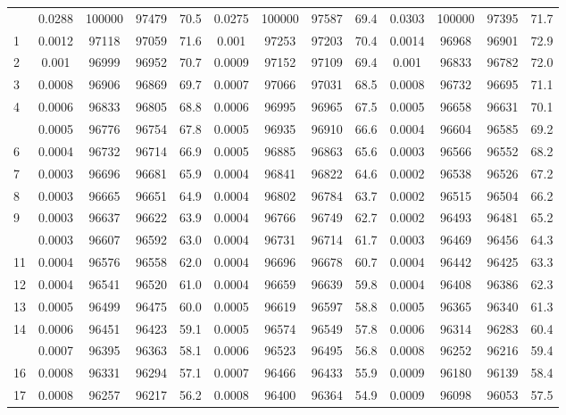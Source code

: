 \documentclass[
  14pt,
]{article}
\begin{document}
\begin{longtable}[t]{lcccccccccccc}
\endfoot
\bottomrule
\endlastfoot
0 & 0.0288 & 100000 & 97479 & 70.5 & 0.0275 & 100000 & 97587 & 69.4 & 0.0303 & 100000 & 97395 & 71.7\\
1 & 0.0012 & 97118 & 97059 & 71.6 & 0.001 & 97253 & 97203 & 70.4 & 0.0014 & 96968 & 96901 & 72.9\\
2 & 0.001 & 96999 & 96952 & 70.7 & 0.0009 & 97152 & 97109 & 69.4 & 0.001 & 96833 & 96782 & 72.0\\
3 & 0.0008 & 96906 & 96869 & 69.7 & 0.0007 & 97066 & 97031 & 68.5 & 0.0008 & 96732 & 96695 & 71.1\\
4 & 0.0006 & 96833 & 96805 & 68.8 & 0.0006 & 96995 & 96965 & 67.5 & 0.0005 & 96658 & 96631 & 70.1\\
\addlinespace
5 & 0.0005 & 96776 & 96754 & 67.8 & 0.0005 & 96935 & 96910 & 66.6 & 0.0004 & 96604 & 96585 & 69.2\\
6 & 0.0004 & 96732 & 96714 & 66.9 & 0.0005 & 96885 & 96863 & 65.6 & 0.0003 & 96566 & 96552 & 68.2\\
7 & 0.0003 & 96696 & 96681 & 65.9 & 0.0004 & 96841 & 96822 & 64.6 & 0.0002 & 96538 & 96526 & 67.2\\
8 & 0.0003 & 96665 & 96651 & 64.9 & 0.0004 & 96802 & 96784 & 63.7 & 0.0002 & 96515 & 96504 & 66.2\\
9 & 0.0003 & 96637 & 96622 & 63.9 & 0.0004 & 96766 & 96749 & 62.7 & 0.0002 & 96493 & 96481 & 65.2\\
\addlinespace
10 & 0.0003 & 96607 & 96592 & 63.0 & 0.0004 & 96731 & 96714 & 61.7 & 0.0003 & 96469 & 96456 & 64.3\\
11 & 0.0004 & 96576 & 96558 & 62.0 & 0.0004 & 96696 & 96678 & 60.7 & 0.0004 & 96442 & 96425 & 63.3\\
12 & 0.0004 & 96541 & 96520 & 61.0 & 0.0004 & 96659 & 96639 & 59.8 & 0.0004 & 96408 & 96386 & 62.3\\
13 & 0.0005 & 96499 & 96475 & 60.0 & 0.0005 & 96619 & 96597 & 58.8 & 0.0005 & 96365 & 96340 & 61.3\\
14 & 0.0006 & 96451 & 96423 & 59.1 & 0.0005 & 96574 & 96549 & 57.8 & 0.0006 & 96314 & 96283 & 60.4\\
\addlinespace
15 & 0.0007 & 96395 & 96363 & 58.1 & 0.0006 & 96523 & 96495 & 56.8 & 0.0008 & 96252 & 96216 & 59.4\\
16 & 0.0008 & 96331 & 96294 & 57.1 & 0.0007 & 96466 & 96433 & 55.9 & 0.0009 & 96180 & 96139 & 58.4\\
17 & 0.0008 & 96257 & 96217 & 56.2 & 0.0008 & 96400 & 96364 & 54.9 & 0.0009 & 96098 & 96053 & 57.5\\

\end{longtable}
\end{document}
